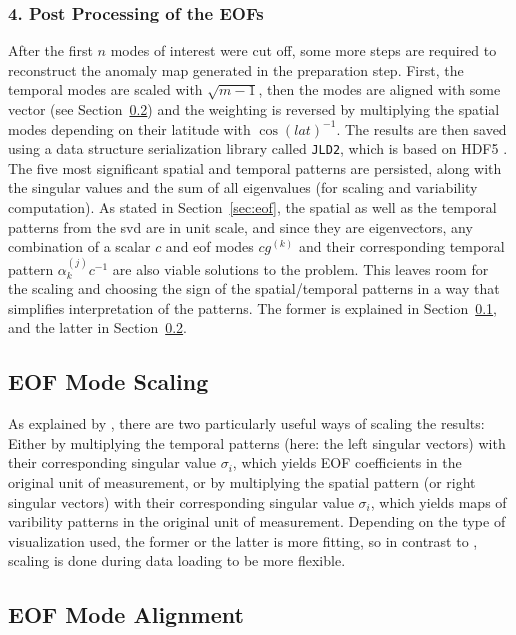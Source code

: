 \subsubsection{4. Post Processing of the EOFs}

After the first $n$ modes of interest were cut off, some more steps are required to reconstruct the anomaly map generated in the preparation step.  
First, the temporal modes are scaled with $\sqrt{m-1}$, then the modes are aligned with some vector (see Section~\ref{sec:mode_alignment}) and the weighting is reversed by multiplying the spatial modes depending on their latitude with $\cos(lat)^{-1}$.
The results are then saved using a data structure serialization library called \texttt{JLD2}, which is based on HDF5 \cite{noauthor_juliaiojld2jl_2024}. 
The five most significant spatial and temporal patterns are persisted, along with the singular values and the sum of all eigenvalues (for scaling and variability computation).
As stated in Section~\ref{sec:eof}, the spatial as well as the temporal patterns from the \ac{svd} are in unit scale, and since they are eigenvectors, any combination of a scalar $c$ and \ac{eof} modes $cg^{(k)}$ and their corresponding temporal pattern $\alpha^{(j)}_k c^{-1}$ are also viable solutions to the problem. 
This leaves room for the scaling and choosing the sign of the spatial/temporal patterns in a way that simplifies interpretation of the patterns. 
The former is explained in Section~\ref{sec:mode_scaling}, and the latter in Section~\ref{sec:mode_alignment}.

\subsection{EOF Mode Scaling}
\label{sec:mode_scaling}

As explained by , there are two particularly useful ways of scaling the results: 
Either by multiplying the temporal patterns (here: the left singular vectors) with their corresponding singular value $\sigma_i$, which yields EOF coefficients in the original unit of measurement, or by multiplying the spatial pattern (or right singular vectors) with their corresponding singular value $\sigma_i$, which yields maps of varibility patterns in the original unit of measurement. 
Depending on the type of visualization used, the former or the latter is more fitting, so in contrast to \cite{vietinghoffdiss}, scaling is done during data loading to be more flexible.

\subsection{EOF Mode Alignment}
\label{sec:mode_alignment}

